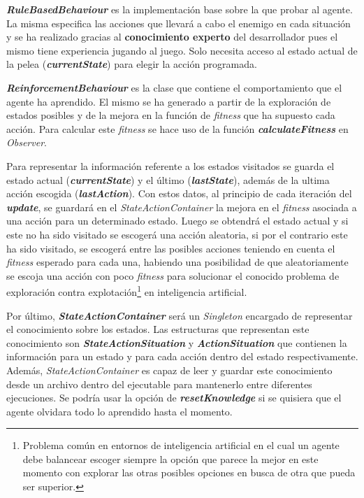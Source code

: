 \bigskip

\textbf{\textit{RuleBasedBehaviour}} es la implementación base sobre la que probar al agente. La misma especifica las acciones que llevará a cabo el enemigo en cada situación y se ha realizado gracias al \textbf{conocimiento experto} del desarrollador pues el mismo tiene experiencia jugando al juego. Solo necesita acceso al estado actual de la pelea (\textbf{\textit{currentState}}) para elegir la acción programada.

\bigskip

\textbf{\textit{ReinforcementBehaviour}} es la clase que contiene el comportamiento que el agente ha aprendido. El mismo se ha generado a partir de la exploración de estados posibles y de la mejora en la función de \textit{fitness} que ha supuesto cada acción. Para calcular este \textit{fitness} se hace uso de la función \textbf{\textit{calculateFitness}} en \textit{Observer}.

\bigskip

Para representar la información referente a los estados visitados se guarda el estado actual (\textbf{\textit{currentState}}) y el último (\textbf{\textit{lastState}}), además de la ultima acción escogida (\textbf{\textit{lastAction}}). Con estos datos, al principio de cada iteración del \textbf{\textit{update}}, se guardará en el \textit{StateActionContainer} la mejora en el \textit{fitness} asociada a una acción para un determinado estado. Luego se obtendrá el estado actual y si este no ha sido visitado se escogerá una acción aleatoria, si por el contrario este ha sido visitado, se escogerá entre las posibles acciones teniendo en cuenta el \textit{fitness} esperado para cada una, habiendo una posibilidad de que aleatoriamente se escoja una acción con poco \textit{fitness} para solucionar el conocido problema de exploración contra explotación\footnote{ Problema común en entornos de inteligencia artificial en el cual un agente debe balancear escoger siempre la opción que parece la mejor en este momento con explorar las otras posibles opciones en busca de otra que pueda ser superior.} en inteligencia artificial.

\bigskip

Por último, \textbf{\textit{StateActionContainer}} será un \textit{Singleton} encargado de representar el conocimiento sobre los estados. Las estructuras que representan este conocimiento son \textbf{\textit{StateActionSituation}} y \textbf{\textit{ActionSituation}} que contienen la información para un estado y para cada acción dentro del estado respectivamente. Además, \textit{StateActionContainer} es capaz de leer y guardar este conocimiento desde un archivo dentro del ejecutable para mantenerlo entre diferentes ejecuciones. Se podría usar la opción de \textbf{\textit{resetKnowledge}} si se quisiera que el agente olvidara todo lo aprendido hasta el momento.


